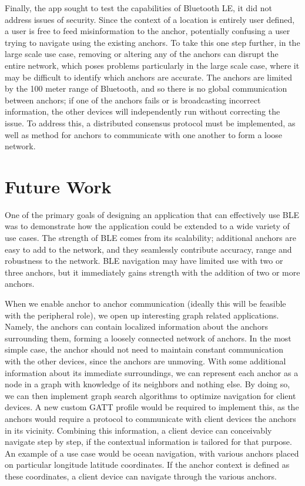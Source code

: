 \documentclass{sig-alternate}
\begin{document}
Finally, the app sought to test the capabilities of Bluetooth LE,
it did not address issues of security. Since the context
of a location is entirely user defined, a user is free to 
feed misinformation to the anchor, potentially confusing
a user trying to navigate using the existing anchors. To take
this one step further, in the large scale use case, removing
or altering any of the anchors can disrupt the entire
network, which poses problems particularly in the large scale
case, where it may be difficult to identify which anchors
are accurate. The anchors are limited by the 100 meter
range of Bluetooth, and so there is no global communication
between anchors; if one of the anchors fails or is broadcasting
incorrect information, the other devices will independently run
without correcting the issue. To address this, a distributed
consensus protocol must be implemented, as well as method
for anchors to communicate with one another to form a
loose network.

\section{Future Work}
\label{sec:future_work}

One of the primary goals of designing an application that can
effectively use BLE was to demonstrate how the application
could be extended to a wide variety of use cases. The strength
of BLE comes from its scalability; additional anchors are easy
to add to the network, and they seamlessly contribute accuracy,
range and robustness to the network. BLE navigation may
have limited use with two or three anchors, but it immediately gains
strength with the addition of two or more anchors. 

When we enable anchor to anchor communication 
(ideally this will be feasible with the peripheral role), we
open up interesting graph related applications. Namely,
the anchors can contain localized information about
the anchors surrounding them, forming a loosely connected
network of anchors. In the most simple case, the
anchor should not need to maintain constant communication
with the other devices, since the anchors are unmoving.
With some additional information about its immediate
surroundings, we can represent each anchor as a node
in a graph with knowledge of its neighbors and nothing
else. By doing so, we can then implement graph search
algorithms to optimize navigation for client devices.
A new custom GATT profile would be required to implement
this, as the anchors would require a protocol to communicate
with client devices the anchors in its vicinity. Combining
this information, a client device can conceivably navigate
step by step, if the contextual information is tailored for
that purpose. An example of a use case would be ocean
navigation, with various anchors placed on particular
longitude latitude coordinates. If the anchor context is
defined as these coordinates, a client device can navigate
through the various anchors. 
\end{document}
